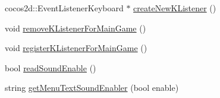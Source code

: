 \begin{DoxyCompactItemize}
\item 
cocos2d\+::\+Event\+Listener\+Keyboard $\ast$ \hyperlink{class_hello_world_ab43ad3eb748cab6180daf5a8cfdcf207}{create\+New\+K\+Listener} ()
\item 
void \hyperlink{class_hello_world_aa4aaf4a6d2ae2e0cb07273d0ee004861}{remove\+K\+Listener\+For\+Main\+Game} ()
\item 
void \hyperlink{class_hello_world_a15deb2e6546d6fd41267dc91932ade26}{register\+K\+Listener\+For\+Main\+Game} ()
\item 
bool \hyperlink{class_hello_world_a0f8c9d1b95e03b397e680b9dafb8f3d9}{read\+Sound\+Enable} ()
\item 
string \hyperlink{class_hello_world_a85e65e13718aba32a3a35044f0f694c5}{get\+Menu\+Text\+Sound\+Enabler} (bool enable)
\end{DoxyCompactItemize}
